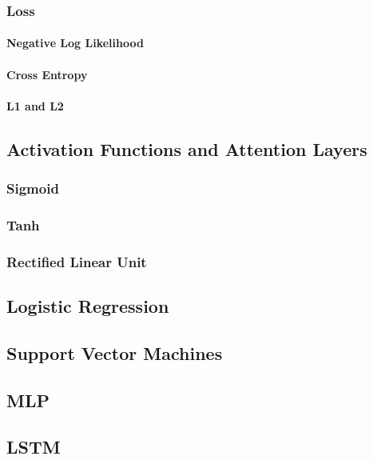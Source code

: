 \subsubsection{Loss}

\paragraph{Negative Log Likelihood}

\paragraph{Cross Entropy}

\paragraph{L1 and L2}

\subsection{Activation Functions and Attention Layers}

\subsubsection{Sigmoid}

\subsubsection{Tanh}

\subsubsection{Rectified Linear Unit}

\subsection{Logistic Regression}

\subsection{Support Vector Machines}

\subsection{MLP}

\subsection{LSTM}


